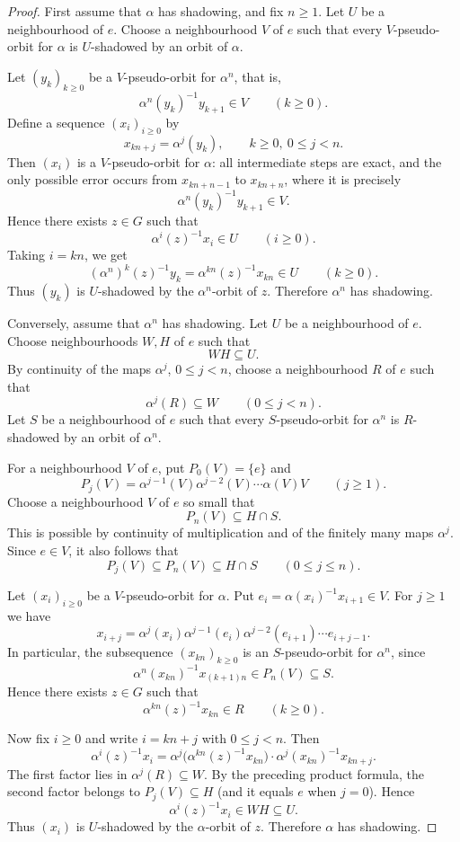 \documentclass[12pt]{amsart}
\theoremstyle{definition}
\numberwithin{equation}{section}
\theoremstyle{remark}
\begin{document}
\begin{proof}
	First assume that $\alpha$ has shadowing, and fix $n\geq 1$. Let $U$ be a
	neighbourhood of $e$. Choose a neighbourhood $V$ of $e$ such that every
	$V$-pseudo-orbit for $\alpha$ is $U$-shadowed by an orbit of $\alpha$.
	
	Let $(y_k)_{k\geq 0}$ be a $V$-pseudo-orbit for $\alpha^n$, that is,
	\[
	\alpha^n(y_k)^{-1}y_{k+1}\in V
	\qquad (k\geq 0).
	\]
	Define a sequence $(x_i)_{i\geq 0}$ by
	\[
	x_{kn+j}=\alpha^j(y_k),
	\qquad k\geq 0,\ 0\leq j<n.
	\]
	Then $(x_i)$ is a $V$-pseudo-orbit for $\alpha$: all intermediate steps are
	exact, and the only possible error occurs from $x_{kn+n-1}$ to $x_{kn+n}$,
	where it is precisely
	\[
	\alpha^n(y_k)^{-1}y_{k+1}\in V.
	\]
	Hence there exists $z\in G$ such that
	\[
	\alpha^i(z)^{-1}x_i\in U
	\qquad (i\geq 0).
	\]
	Taking $i=kn$, we get
	\[
	(\alpha^n)^k(z)^{-1}y_k
	=
	\alpha^{kn}(z)^{-1}x_{kn}
	\in U
	\qquad (k\geq 0).
	\]
	Thus $(y_k)$ is $U$-shadowed by the $\alpha^n$-orbit of $z$. Therefore
	$\alpha^n$ has shadowing.
	
	Conversely, assume that $\alpha^n$ has shadowing. Let $U$ be a
	neighbourhood of $e$. Choose neighbourhoods $W,H$ of $e$ such that
	\[
	WH\subseteq U.
	\]
	By continuity of the maps $\alpha^j$, $0\leq j<n$, choose a neighbourhood
	$R$ of $e$ such that
	\[
	\alpha^j(R)\subseteq W
	\qquad (0\leq j<n).
	\]
	Let $S$ be a neighbourhood of $e$ such that every $S$-pseudo-orbit for
	$\alpha^n$ is $R$-shadowed by an orbit of $\alpha^n$.
	
	For a neighbourhood $V$ of $e$, put $P_0(V)=\{e\}$ and
	\[
	P_j(V)=\alpha^{j-1}(V)\alpha^{j-2}(V)\cdots\alpha(V)V
	\qquad(j\geq 1).
	\]
	Choose a neighbourhood $V$ of $e$ so small that
	\[
	P_n(V)\subseteq H\cap S.
	\]
	This is possible by continuity of multiplication and of the finitely many
	maps $\alpha^j$. Since $e\in V$, it also follows that
	\[
	P_j(V)\subseteq P_n(V)\subseteq H\cap S
	\qquad(0\leq j\leq n).
	\]
	
	Let $(x_i)_{i\geq 0}$ be a $V$-pseudo-orbit for $\alpha$. Put
	$e_i=\alpha(x_i)^{-1}x_{i+1}\in V$. For $j\geq 1$ we have
	\[
	x_{i+j}
	=
	\alpha^j(x_i)\alpha^{j-1}(e_i)\alpha^{j-2}(e_{i+1})\cdots e_{i+j-1}.
	\]
	In particular, the subsequence $(x_{kn})_{k\geq 0}$ is an $S$-pseudo-orbit
	for $\alpha^n$, since
	\[
	\alpha^n(x_{kn})^{-1}x_{(k+1)n}
	\in
	P_n(V)\subseteq S.
	\]
	Hence there exists $z\in G$ such that
	\[
	\alpha^{kn}(z)^{-1}x_{kn}\in R
	\qquad (k\geq 0).
	\]
	
	Now fix $i\geq 0$ and write $i=kn+j$ with $0\leq j<n$. Then
	\[
	\alpha^i(z)^{-1}x_i
	=
	\alpha^j\bigl(\alpha^{kn}(z)^{-1}x_{kn}\bigr)
	\cdot
	\alpha^j(x_{kn})^{-1}x_{kn+j}.
	\]
	The first factor lies in $\alpha^j(R)\subseteq W$. By the preceding
	product formula, the second factor belongs to $P_j(V)\subseteq H$ (and it
	equals $e$ when $j=0$). Hence
	\[
	\alpha^i(z)^{-1}x_i\in WH\subseteq U.
	\]
	Thus $(x_i)$ is $U$-shadowed by the $\alpha$-orbit of $z$. Therefore
	$\alpha$ has shadowing.
\end{proof}
\end{document}
